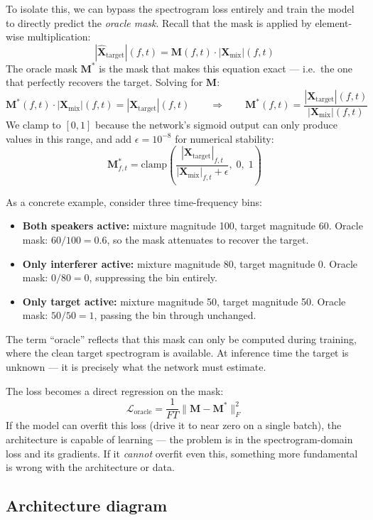 \documentclass{article}
\begin{document}
To isolate this, we can bypass the spectrogram loss entirely and train the model to directly predict the \emph{oracle mask}. Recall that the mask is applied by element-wise multiplication:
\[
    |\hat{\mathbf{X}}_{\text{target}}|(f,t) = \mathbf{M}(f,t) \cdot |\mathbf{X}_{\text{mix}}|(f,t)
\]
The oracle mask $\mathbf{M}^*$ is the mask that makes this equation exact --- i.e.\ the one that perfectly recovers the target. Solving for $\mathbf{M}$:
\[
    \mathbf{M}^*(f,t) \cdot |\mathbf{X}_{\text{mix}}|(f,t) = |\mathbf{X}_{\text{target}}|(f,t)
    \qquad\Longrightarrow\qquad
    \mathbf{M}^*(f,t) = \frac{|\mathbf{X}_{\text{target}}|(f,t)}{|\mathbf{X}_{\text{mix}}|(f,t)}
\]
We clamp to $[0, 1]$ because the network's sigmoid output can only produce values in this range, and add $\epsilon = 10^{-8}$ for numerical stability:
\[
    \mathbf{M}^{*}_{f,t} = \text{clamp}\!\left(\frac{|\mathbf{X}_{\text{target}}|_{f,t}}{|\mathbf{X}_{\text{mix}}|_{f,t} + \epsilon},\; 0,\; 1\right)
\]

As a concrete example, consider three time-frequency bins:
\begin{itemize}
    \item \textbf{Both speakers active:} mixture magnitude 100, target magnitude 60. Oracle mask: $60/100 = 0.6$, so the mask attenuates to recover the target.
    \item \textbf{Only interferer active:} mixture magnitude 80, target magnitude 0. Oracle mask: $0/80 = 0$, suppressing the bin entirely.
    \item \textbf{Only target active:} mixture magnitude 50, target magnitude 50. Oracle mask: $50/50 = 1$, passing the bin through unchanged.
\end{itemize}

The term ``oracle'' reflects that this mask can only be computed during training, where the clean target spectrogram is available. At inference time the target is unknown --- it is precisely what the network must estimate.

The loss becomes a direct regression on the mask:
\[
    \mathcal{L}_{\text{oracle}} = \frac{1}{FT}\bigl\|\mathbf{M} - \mathbf{M}^{*}\bigr\|_F^2
\]
If the model can overfit this loss (drive it to near zero on a single batch), the architecture is capable of learning --- the problem is in the spectrogram-domain loss and its gradients. If it \emph{cannot} overfit even this, something more fundamental is wrong with the architecture or data.

\subsection{Architecture diagram}
\end{document}
